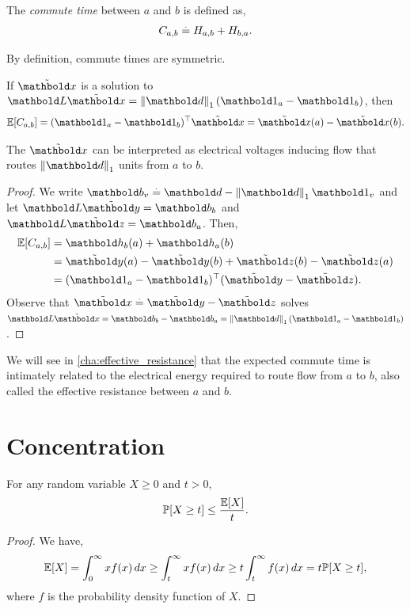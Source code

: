 \begin{defn} The \emph{commute time} between $a$ and $b$ is defined as, \begin{align}
    C_{a,b} \overset{.}{=} H_{a,b} + H_{b,a}.
\end{align}
\end{defn}
\begin{rmk}
By definition, commute times are symmetric.
\end{rmk}

\begin{lem}
If $\ex$ is a solution to $\mL\ex = \norm{\vd}_1 (\vOne_a - \vOne_b)$, then \begin{align}
    \E{C_{a,b}} = \trans{(\vOne_a - \vOne_b)}\ex = \ex(a) - \ex(b).
\end{align}
\end{lem} The $\ex$ can be interpreted as electrical voltages inducing flow that routes $\norm{\vd}_1$ units from $a$ to $b$.
\begin{proof}
We write $\vb_v \defeq \vd - \norm{\vd}_1 \vOne_v$ and let $\mL\ey = \vb_b$ and $\mL\ez = \vb_a$. Then, \begin{align*}
    \E{C_{a,b}} &= \vh_b(a) + \vh_a(b) \\
    &= \ey(a) - \ey(b) + \ez(b) - \ez(a) \\
    &= \trans{(\vOne_a - \vOne_b)}(\ey - \ez).
\end{align*} Observe that $\ex \defeq \ey - \ez$ solves $\mL\ex = \vb_b - \vb_a = \norm{\vd}_1 (\vOne_a - \vOne_b)$.
\end{proof}

We will see in \cref{cha:effective_resistance} that the expected commute time is intimately related to the electrical energy required to route flow from $a$ to $b$, also called the effective resistance between $a$ and $b$.

\section{Concentration}

\begin{thm}
For any random variable $X \geq 0$ and $t > 0$, \begin{align}
    \Pr{X \geq t} \leq \frac{\E{X}}{t}.
\end{align}
\end{thm}
\begin{proof} We have, \begin{align*}
    \E{X} = \int_0^\infty x f(x) \,dx \geq \int_t^\infty x f(x) \, dx \geq t \int_t^\infty f(x) \,dx = t \Pr{X \geq t},
\end{align*} where $f$ is the probability density function of $X$.
\end{proof}

